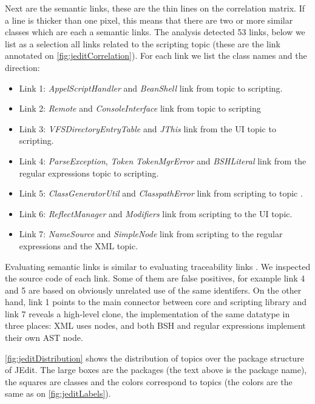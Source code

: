 \documentclass[10pt]{book}
\begin{document}
Next are the semantic links, these are the thin lines on the correlation matrix. If a line is thicker than one pixel, this means that there are two or more similar classes which are each a semantic links. The analysis detected 53 links, below we list as a selection all links related to the scripting topic (these are the link annotated on \autoref{fig:jeditCorrelation}). For each link we list the class names and the direction:

\begin{itemize}
  \item Link 1: \emph{AppelScriptHandler} and \emph{BeanShell} link from topic \red to scripting.
  \item Link 2: \emph{Remote} and \emph{ConsoleInterface} link from topic \red to scripting
  \item Link 3: \emph{VFSDirectoryEntryTable} and \emph{JThis} link from the UI topic to scripting.
  \item Link 4: \emph{ParseException}, \emph{Token} \emph{TokenMgrError} and \emph{BSHLiteral} link from the regular expressions topic to scripting.
  \item Link 5: \emph{ClassGeneratorUtil} and \emph{ClasspathError} link from scripting to topic \red.
  \item Link 6: \emph{ReflectManager} and \emph{Modifiers} link from scripting to the UI topic.
  \item Link 7: \emph{NameSource} and \emph{SimpleNode} link from scripting to the regular expressions and the XML topic.
\end{itemize}

Evaluating semantic links is similar to evaluating traceability links \cite{Luci04a}. We inspected the source code of each link. Some of them are false positives, for example link 4 and 5 are based on obviously unrelated use of the same identifers. On the other hand, link 1 points to the main connector between core and scripting library and link 7 reveals a high-level clone, the implementation of the same datatype in three places: XML uses nodes, and both BSH and regular expressions implement their own AST node.


\autoref{fig:jeditDistribution} shows the distribution of topics over the package structure of JEdit. The large boxes are the packages (the text above is the package name), the squares are classes and the colors correspond to topics (the colors are the same as on \autoref{fig:jeditLabels}).
\end{document}
